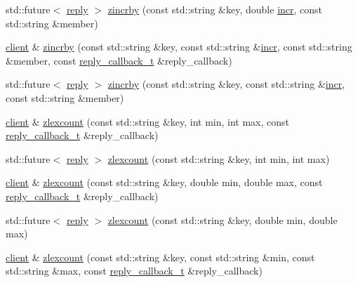 \begin{DoxyCompactItemize}
\item 
std\+::future$<$ \hyperlink{classcpp__redis_1_1reply}{reply} $>$ \hyperlink{classcpp__redis_1_1client_a59164f47b17261f1a82cef5da072aa4c}{zincrby} (const std\+::string \&key, double \hyperlink{classcpp__redis_1_1client_a2f9ba6c7e83451207403096b19da4faa}{incr}, const std\+::string \&member)
\item 
\hyperlink{classcpp__redis_1_1client}{client} \& \hyperlink{classcpp__redis_1_1client_a6f0b61b420ebc8e054c766c6f5034096}{zincrby} (const std\+::string \&key, const std\+::string \&\hyperlink{classcpp__redis_1_1client_a2f9ba6c7e83451207403096b19da4faa}{incr}, const std\+::string \&member, const \hyperlink{classcpp__redis_1_1client_a061a1140d36d2eaeda82b09a0bb3f9f2}{reply\+\_\+callback\+\_\+t} \&reply\+\_\+callback)
\item 
std\+::future$<$ \hyperlink{classcpp__redis_1_1reply}{reply} $>$ \hyperlink{classcpp__redis_1_1client_a202a2adbf6e0d127ad1c5cc301754e5b}{zincrby} (const std\+::string \&key, const std\+::string \&\hyperlink{classcpp__redis_1_1client_a2f9ba6c7e83451207403096b19da4faa}{incr}, const std\+::string \&member)
\item 
\hyperlink{classcpp__redis_1_1client}{client} \& \hyperlink{classcpp__redis_1_1client_ad4a8fef29a047724ad4e97eedfb53c62}{zlexcount} (const std\+::string \&key, int min, int max, const \hyperlink{classcpp__redis_1_1client_a061a1140d36d2eaeda82b09a0bb3f9f2}{reply\+\_\+callback\+\_\+t} \&reply\+\_\+callback)
\item 
std\+::future$<$ \hyperlink{classcpp__redis_1_1reply}{reply} $>$ \hyperlink{classcpp__redis_1_1client_aff60a1181d93d961f6ca1903522ce899}{zlexcount} (const std\+::string \&key, int min, int max)
\item 
\hyperlink{classcpp__redis_1_1client}{client} \& \hyperlink{classcpp__redis_1_1client_aba1b2a6c750b13b1a632ebc8ca90cf60}{zlexcount} (const std\+::string \&key, double min, double max, const \hyperlink{classcpp__redis_1_1client_a061a1140d36d2eaeda82b09a0bb3f9f2}{reply\+\_\+callback\+\_\+t} \&reply\+\_\+callback)
\item 
std\+::future$<$ \hyperlink{classcpp__redis_1_1reply}{reply} $>$ \hyperlink{classcpp__redis_1_1client_ab492b901c49f913d0120b87afee9458c}{zlexcount} (const std\+::string \&key, double min, double max)
\item 
\hyperlink{classcpp__redis_1_1client}{client} \& \hyperlink{classcpp__redis_1_1client_a90bd86c8348ca8bfec29d66d9e5bdfc3}{zlexcount} (const std\+::string \&key, const std\+::string \&min, const std\+::string \&max, const \hyperlink{classcpp__redis_1_1client_a061a1140d36d2eaeda82b09a0bb3f9f2}{reply\+\_\+callback\+\_\+t} \&reply\+\_\+callback)

\end{DoxyCompactItemize}
